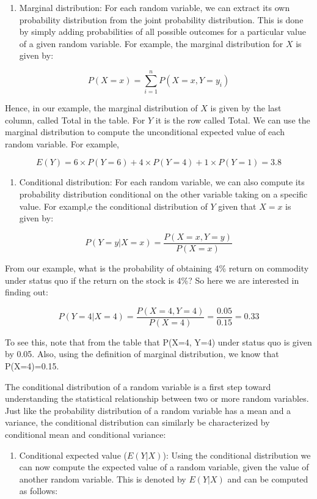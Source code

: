 \documentclass[]{book}
\providecommand{\tightlist}{%
  \setlength{\itemsep}{0pt}\setlength{\parskip}{0pt}}
\theoremstyle{definition}
\theoremstyle{definition}
\theoremstyle{definition}
\theoremstyle{remark}
\begin{document}
\begin{enumerate}
\def\labelenumi{\arabic{enumi}.}
\tightlist
\item
  Marginal distribution: For each random variable, we can extract its own probability distribution from the joint probability distribution. This is done by simply adding probabilities of all possible outcomes for a particular value of a given random variable. For example, the marginal distribution for \(X\) is given by:
\end{enumerate}

\[P(X=x)=\sum_{i=1}^nP(X=x, Y=y_i)\]

Hence, in our example, the marginal distribution of \(X\) is given by the last column, called Total in the table. For \(Y\) it is the row called Total. We can use the marginal distribution to compute the unconditional expected value of each random variable. For example,

\[E(Y) = 6 \times P(Y=6) + 4 \times P(Y=4)+1 \times P(Y=1)=3.8\]

\begin{enumerate}
\def\labelenumi{\arabic{enumi}.}
\setcounter{enumi}{1}
\tightlist
\item
  Conditional distribution: For each random variable, we can also compute its probability distribution conditional on the other variable taking on a specific value. For exampl,e the conditional distribution of \(Y\) given that \(X=x\) is given by:
\end{enumerate}

\[ P(Y=y|X=x) =\frac{P(X=x,Y=y)}{P(X=x)}\]

From our example, what is the probability of obtaining 4\% return on commodity under status quo if the return on the stock is 4\%? So here we are interested in finding out:

\[ P(Y=4|X=4) =\frac{P(X=4,Y=4)}{P(X=4)}= \frac{0.05}{0.15}=0.33\]

To see this, note that from the table that P(X=4, Y=4) under status quo is given by 0.05. Also, using the definition of marginal distribution, we know that P(X=4)=0.15.

The conditional distribution of a random variable is a first step toward understanding the statistical relationship between two or more random variables. Just like the probability distribution of a random variable has a mean and a variance, the conditional distribution can similarly be characterized by conditional mean and conditional variance:

\begin{enumerate}
\def\labelenumi{\arabic{enumi}.}
\tightlist
\item
  Conditional expected value (\(E(Y|X)\)): Using the conditional distribution we can now compute the expected value of a random variable, given the value of another random variable. This is denoted by \(E(Y|X)\) and can be computed as follows:
\end{enumerate}
\end{document}
